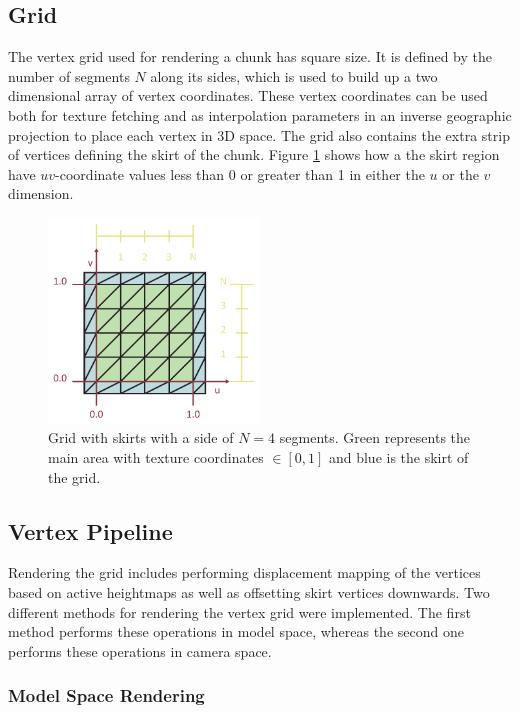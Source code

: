 \subsection{Grid}
The vertex grid used for rendering a chunk has square size. It is defined by the number of segments $N$ along its sides, which is used to build up a two dimensional array of vertex coordinates. These vertex coordinates can be used both for texture fetching and as interpolation parameters in an inverse geographic projection to place each vertex in 3D space. The grid also contains the extra strip of vertices defining the skirt of the chunk. Figure \ref{fig:grid} shows how a the skirt region have $uv$-coordinate values less than 0 or greater than 1 in either the $u$ or the $v$ dimension. 

\begin{figure}[!h]
    \centering
    \includegraphics[width=0.5\textwidth]{figures/implementation/rendering/grid.pdf}
    \caption{Grid with skirts with a side of $N=4$ segments. Green represents the main area with texture coordinates $\in \left[  0, 1 \right] $ and blue is the skirt of the grid.}
    \label{fig:grid}
\end{figure}

\subsection{Vertex Pipeline}
Rendering the grid includes performing displacement mapping of the vertices based on active heightmaps as well as offsetting skirt vertices downwards. Two different methods for rendering the vertex grid were implemented. The first method performs these operations in model space, whereas the second one performs these operations in camera space.

\subsubsection{Model Space Rendering}

